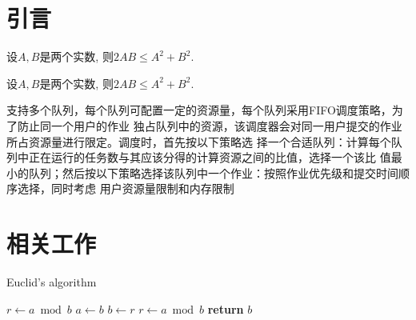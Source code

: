 \documentclass{ctexart}
\begin{document}
\begin{multicols*}{2}
\section{引言}

\begin{theorem}[均值不等式]
设$A,B$是两个实数, 则$2AB\leq A^2+B^2$.
\end{theorem}

\begin{definition}[均值不等式]
设$A,B$是两个实数, 则$2AB\leq A^2+B^2$.
\end{definition}

支持多个队列，每个队列可配置一定的资源量，每个队列采用FIFO调度策略，为了防止同一个用户的作业
独占队列中的资源，该调度器会对同一用户提交的作业\cite{knuth}所占资源量进行限定。调度时，首先按以下策略选
择一个合适队列：计算每个队列中正在运行的任务数与其应该分得的计算资源之间的比值，选择一个该比
值最小的队列；然后按以下策略选择该队列中一个作业：按照作业优先级\cite{lamport}和提交时间顺序选择，同时考虑
用户资源量限制和内存限制

\section{相关工作}
\begin{algorithm}
\caption{Euclid’s algorithm}\label{euclid}
\begin{algorithmic}[1]
   \State $r\gets a\bmod b$
      \State $a\gets b$
      \State $b\gets r$
      \State $r\gets a\bmod b$
   \EndWhile\label{euclidendwhile}
   \State \textbf{return} $b$
\EndProcedure
\end{algorithmic}
\end{algorithm}

\appendix
\small
\setlength{\itemsep}{0pt}
\setlength{\parskip}{0pt}  %



\end{multicols*}
\end{document}
